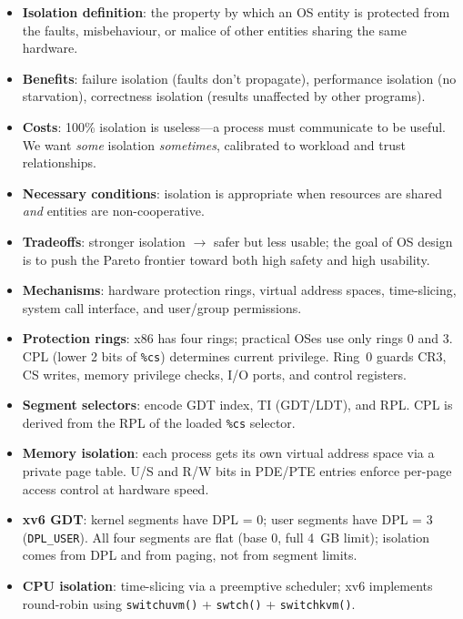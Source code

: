\documentclass[11pt]{article}
\begin{document}
\begin{itemize}
    \item \textbf{Isolation definition}: the property by which an OS entity is protected
          from the faults, misbehaviour, or malice of other entities sharing the same hardware.
    \item \textbf{Benefits}: failure isolation (faults don't propagate), performance
          isolation (no starvation), correctness isolation (results unaffected by other programs).
    \item \textbf{Costs}: 100\% isolation is useless---a process must communicate to be
          useful. We want \emph{some} isolation \emph{sometimes}, calibrated to workload and
          trust relationships.
    \item \textbf{Necessary conditions}: isolation is appropriate when resources are shared
          \emph{and} entities are non-cooperative.
    \item \textbf{Tradeoffs}: stronger isolation $\to$ safer but less usable; the goal of
          OS design is to push the Pareto frontier toward both high safety and high usability.
    \item \textbf{Mechanisms}: hardware protection rings, virtual address spaces, time-slicing,
          system call interface, and user/group permissions.
    \item \textbf{Protection rings}: x86 has four rings; practical OSes use only rings 0 and 3.
          CPL (lower 2 bits of \texttt{\%cs}) determines current privilege. Ring~0 guards
          CR3, CS writes, memory privilege checks, I/O ports, and control registers.
    \item \textbf{Segment selectors}: encode GDT index, TI (GDT/LDT), and RPL. CPL is
          derived from the RPL of the loaded \texttt{\%cs} selector.
    \item \textbf{Memory isolation}: each process gets its own virtual address space via
          a private page table. U/S and R/W bits in PDE/PTE entries enforce per-page
          access control at hardware speed.
    \item \textbf{xv6 GDT}: kernel segments have DPL = 0; user segments have DPL = 3
          (\texttt{DPL\_USER}). All four segments are flat (base 0, full 4~GB limit);
          isolation comes from DPL and from paging, not from segment limits.
    \item \textbf{CPU isolation}: time-slicing via a preemptive scheduler; xv6 implements
          round-robin using \texttt{switchuvm()} + \texttt{swtch()} + \texttt{switchkvm()}.

\end{itemize}
\end{document}
